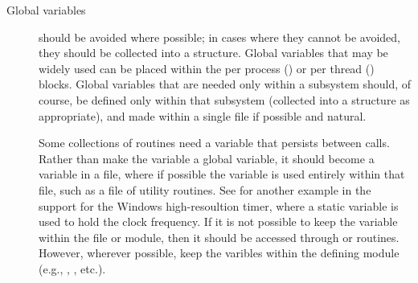 \documentclass{article}
\begin{document}
\begin{description}





\item[Global variables]should be avoided where possible; in cases
where they cannot be avoided, they should be collected into a
structure.  Global variables that may be widely used can be placed
within the per process () or per thread
() blocks.  Global variables that are needed only
within a subsystem should, of course, be defined only within that
subsystem (collected into a structure as appropriate), and made
 within a single file if possible and natural.

Some collections of routines need a variable that persists between calls.
Rather than make the variable a global variable, it should become a
 variable in a file, where if possible the variable is used
entirely within that file, such as a file of utility routines.  See
 for another example in the support for the Windows
high-resoultion timer, where a static variable is used to hold the
clock frequency.  If it is not possible to keep the variable within
the file or module, then it should be accessed through  or
routines.  However, wherever possible, keep the varibles within the
defining module (e.g., , , etc.).


\end{description}
\end{document}
